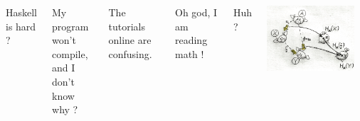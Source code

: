 \documentclass[xcolor={table}]{beamer}
\begin{document}
\begin{frame}{}{}

    \begin{columns}
    {\Large Haskell is hard ?}

    \pause\bigskip
    My program won't compile,\\ and I don't know why ?

    \pause\bigskip
    The tutorials online are confusing.

    \pause\bigskip
    Oh god, I am reading math !

    \pause\bigskip
    Huh ?

    \includegraphics[width=0.9\textwidth]{images/content-proxy.png}
        
    \end{columns}

\end{frame}
\end{document}
